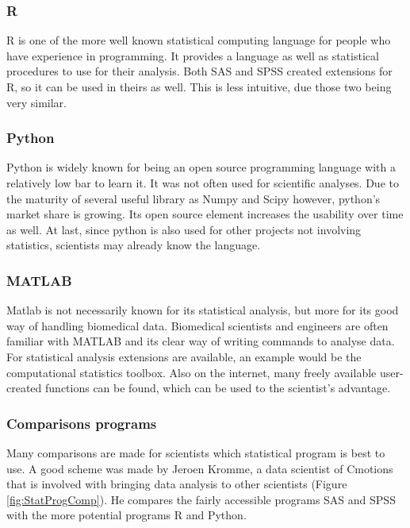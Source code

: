 \documentclass[10pt,a4paper]{report}
\begin{document}
	\subsubsection{R}
	
	R is one of the more well known statistical computing language for people who have experience in programming. It provides a language as well as statistical procedures to use for their analysis. Both SAS and SPSS created extensions for R, so it can be used in theirs as well. This is less intuitive, due those two being very similar. \cite{muenchen2011r}
	
	\subsubsection{Python}
	
	Python is widely known for being an open source programming language with a 
	relatively low bar to learn it. It was not often used for scientific 
	analyses. Due to the maturity of several useful library as Numpy and Scipy 
	however, python's market share is growing. Its open source element 
	increases the usability over time as well. At last, since python is also 
	used for other projects not involving statistics, scientists may already 
	know the language. 
	\cite{mckinney2010data}
	
	\subsubsection{MATLAB}
	
	Matlab is not necessarily known for its statistical analysis, but more for 
	its good way of handling biomedical data. Biomedical scientists and 
	engineers are often familiar with MATLAB and its clear way of writing 
	commands to analyse data. For statistical analysis extensions are 
	available, an example would be the computational statistics toolbox. Also 
	on the internet, many freely available user-created functions can be found, 
	which can be used to the scientist's advantage.
	\cite{martinez2007computational}
	
	\subsubsection{Comparisons programs}
	
	Many comparisons are made for scientists which statistical program is best 
	to use. A good scheme was made by Jeroen Kromme, a data scientist of 
	Cmotions that is involved with bringing data analysis to other scientists 
	(Figure \ref{fig:StatProgComp}). He compares the fairly accessible programs 
	SAS and SPSS with the more potential programs R and 
	Python.\cite{BlogKromme2017}
	
\end{document}
